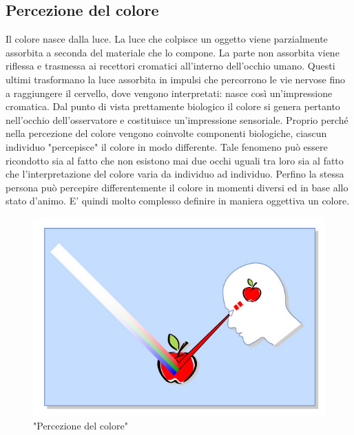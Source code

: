 \documentclass[a4paper,11pt]{article}
\begin{document}
        \subsection{Percezione del colore}
        Il colore nasce dalla luce. La luce che colpisce un oggetto viene parzialmente assorbita a
        seconda del materiale che lo compone. La parte non assorbita viene riflessa e trasmessa ai recettori cromatici
        all’interno dell’occhio umano. Questi ultimi trasformano la luce assorbita in impulsi che
        percorrono le vie nervose fino a raggiungere il cervello, dove vengono interpretati: nasce così
        un’impressione cromatica. Dal punto di vista prettamente biologico il colore si genera pertanto
        nell’occhio dell’osservatore e costituisce un’impressione sensoriale.
        Proprio perché nella percezione del colore vengono coinvolte componenti biologiche, ciascun individuo "percepisce" il colore in modo
        differente. Tale fenomeno può essere ricondotto sia al fatto che non esistono mai due occhi
        uguali tra loro sia al fatto che l’interpretazione del colore varia da individuo ad individuo.
        Perfino la stessa persona può percepire differentemente il colore in momenti diversi ed in base
        allo stato d’animo. E' quindi molto complesso definire in maniera oggettiva un colore.

        \begin{figure}[h]
            \centering
            \includegraphics[scale=0.8]{colorimetria1}
            \caption{"Percezione del colore"}
        \end{figure}
        \newpage
\end{document}
